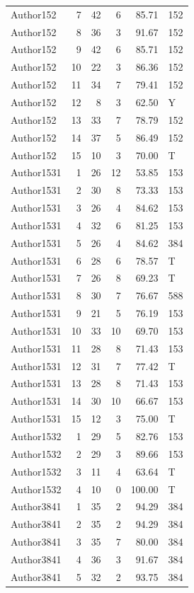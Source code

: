 \begin{longtable}{lrrrrl}
Author152 & 7 & 42 & 6 & 85.71 & 152\\
Author152 & 8 & 36 & 3 & 91.67 & 152\\
Author152 & 9 & 42 & 6 & 85.71 & 152\\
Author152 & 10 & 22 & 3 & 86.36 & 152\\
Author152 & 11 & 34 & 7 & 79.41 & 152\\
Author152 & 12 & 8 & 3 & 62.50 & Y\\
Author152 & 13 & 33 & 7 & 78.79 & 152\\
Author152 & 14 & 37 & 5 & 86.49 & 152\\
Author152 & 15 & 10 & 3 & 70.00 & T\\
Author1531 & 1 & 26 & 12 & 53.85 & 153\\
Author1531 & 2 & 30 & 8 & 73.33 & 153\\
Author1531 & 3 & 26 & 4 & 84.62 & 153\\
Author1531 & 4 & 32 & 6 & 81.25 & 153\\
Author1531 & 5 & 26 & 4 & 84.62 & 384\\
Author1531 & 6 & 28 & 6 & 78.57 & T\\
Author1531 & 7 & 26 & 8 & 69.23 & T\\
Author1531 & 8 & 30 & 7 & 76.67 & 588\\
Author1531 & 9 & 21 & 5 & 76.19 & 153\\
Author1531 & 10 & 33 & 10 & 69.70 & 153\\
Author1531 & 11 & 28 & 8 & 71.43 & 153\\
Author1531 & 12 & 31 & 7 & 77.42 & T\\
Author1531 & 13 & 28 & 8 & 71.43 & 153\\
Author1531 & 14 & 30 & 10 & 66.67 & 153\\
Author1531 & 15 & 12 & 3 & 75.00 & T\\
Author1532 & 1 & 29 & 5 & 82.76 & 153\\
Author1532 & 2 & 29 & 3 & 89.66 & 153\\
Author1532 & 3 & 11 & 4 & 63.64 & T\\
Author1532 & 4 & 10 & 0 & 100.00 & T\\
Author3841 & 1 & 35 & 2 & 94.29 & 384\\
Author3841 & 2 & 35 & 2 & 94.29 & 384\\
Author3841 & 3 & 35 & 7 & 80.00 & 384\\
Author3841 & 4 & 36 & 3 & 91.67 & 384\\
Author3841 & 5 & 32 & 2 & 93.75 & 384\\

\end{longtable}
